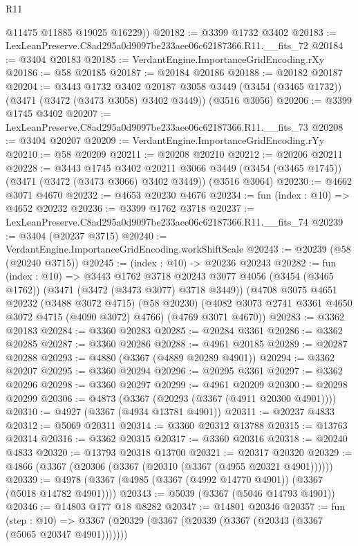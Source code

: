 \begin{lexlean}{R11}
\begin{coremodule}
        @11475
        @11885
        @19025
        @16229))
@20182 := @3399 @1732 @3402
@20183 := LexLeanPreserve.C8ad295a0d9097be233aee06c62187366.R11.__fits_72
@20184 := @3404 @20183
@20185 := VerdantEngine.ImportanceGridEncoding.rXy
@20186 := @58 @20185
@20187 := @20184 @20186
@20188 := @20182 @20187
@20204 := @3443
    @1732
    @3402
    @20187
    @3058
    @3449
    (@3454 (@3465 @1732))
    (@3471 (@3472 (@3473 @3058) @3402 @3449))
    (@3516 @3056)
@20206 := @3399 @1745 @3402
@20207 := LexLeanPreserve.C8ad295a0d9097be233aee06c62187366.R11.__fits_73
@20208 := @3404 @20207
@20209 := VerdantEngine.ImportanceGridEncoding.rYy
@20210 := @58 @20209
@20211 := @20208 @20210
@20212 := @20206 @20211
@20228 := @3443
    @1745
    @3402
    @20211
    @3066
    @3449
    (@3454 (@3465 @1745))
    (@3471 (@3472 (@3473 @3066) @3402 @3449))
    (@3516 @3064)
@20230 := @4662 @3071 @4670
@20232 := @4653 @20230 @4676
@20234 := fun (index : @10) => @4652 @20232
@20236 := @3399 @1762 @3718
@20237 := LexLeanPreserve.C8ad295a0d9097be233aee06c62187366.R11.__fits_74
@20239 := @3404 (@20237 @3715)
@20240 := VerdantEngine.ImportanceGridEncoding.workShiftScale
@20243 := @20239 (@58 (@20240 @3715))
@20245 := (index : @10) -> @20236 @20243
@20282 := fun (index : @10) =>
  @3443
    @1762
    @3718
    @20243
    @3077
    @4056
    (@3454 (@3465 @1762))
    (@3471 (@3472 (@3473 @3077) @3718 @3449))
    (@4708
      @3075
      @4651
      @20232
      (@3488 @3072 @4715)
      (@58 @20230)
      (@4082 @3073 @2741 @3361 @4650 @3072 @4715 (@4090 @3072) @4766)
      (@4769 @3071 @4670))
@20283 := @3362 @20183
@20284 := @3360 @20283
@20285 := @20284 @3361
@20286 := @3362 @20285
@20287 := @3360 @20286
@20288 := @4961 @20185
@20289 := @20287 @20288
@20293 := @4880 (@3367 (@4889 @20289 @4901))
@20294 := @3362 @20207
@20295 := @3360 @20294
@20296 := @20295 @3361
@20297 := @3362 @20296
@20298 := @3360 @20297
@20299 := @4961 @20209
@20300 := @20298 @20299
@20306 := @4873 (@3367 (@20293 (@3367 (@4911 @20300 @4901))))
@20310 := @4927 (@3367 (@4934 @13781 @4901))
@20311 := @20237 @4833
@20312 := @5069 @20311
@20314 := @3360 @20312 @13788
@20315 := @13763 @20314
@20316 := @3362 @20315
@20317 := @3360 @20316
@20318 := @20240 @4833
@20320 := @13793 @20318 @13700
@20321 := @20317 @20320
@20329 := @4866 (@3367 (@20306 (@3367 (@20310 (@3367 (@4955 @20321 @4901))))))
@20339 := @4978 (@3367 (@4985 (@3367 (@4992 @14770 @4901)) (@3367 (@5018 @14782 @4901))))
@20343 := @5039 (@3367 (@5046 @14793 @4901))
@20346 := @14803 @177 @18 @8282
@20347 := @14801 @20346
@20357 := fun (step : @10) =>
  @3367 (@20329 (@3367 (@20339 (@3367 (@20343 (@3367 (@5065 @20347 @4901)))))))

\end{coremodule}
\end{lexlean}
